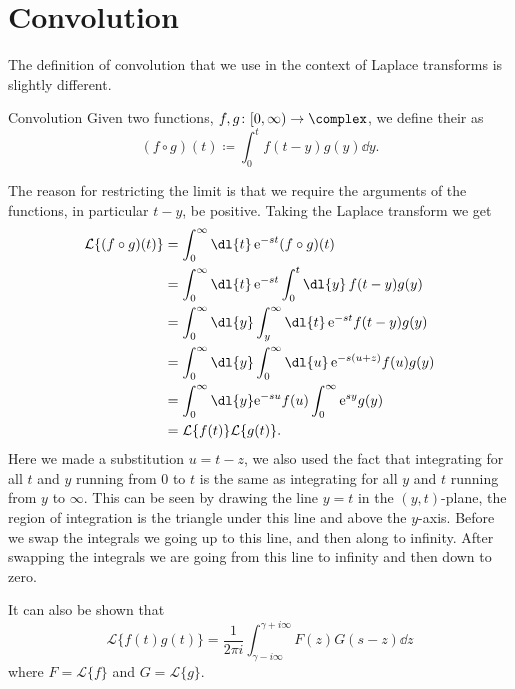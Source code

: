\documentclass[fleqn]{NotesClass}
\newcommand*{\e}{\mathrm{e}}
\newcommand*{\laplaceTransform}{\mathcal{L}}
\begin{document}
    \section{Convolution}
    The definition of convolution that we use in the context of Laplace transforms is slightly different.
    \begin{dfn}{Convolution}{}
        Given two functions, \(f, g \colon [0, \infty) \to \complex\), we define their  as
        \begin{equation}
            (f \circ g)(t) \coloneqq \int_{0}^{t} f(t - y)g(y) \dd{y}.
        \end{equation}
    \end{dfn}
    
    The reason for restricting the limit is that we require the arguments of the functions, in particular \(t - y\), be positive.
    Taking the Laplace transform we get
    \begin{align}
        \laplaceTransform\{ (f \circ g)(t) \} &= \int_{0}^{\infty} \dl{t} \, \e^{-st}(f \circ g)(t)\\
        &= \int_{0}^{\infty} \dl{t} \, \e^{-st} \int_{0}^{t} \dl{y} \, f(t - y)g(y)\\
        &= \int_{0}^{\infty} \dl{y} \int_{y}^{\infty} \dl{t} \, \e^{-st} f(t - y)g(y)\\
        &= \int_{0}^{\infty} \dl{y} \int_{0}^{\infty} \dl{u} \, \e^{-s(u + z)} f(u)g(y)\\
        &= \int_{0}^{\infty} \dl{y} \e^{-su} f(u) \int_{0}^{\infty} \e^{sy}g(y)\\
        &= \laplaceTransform\{ f(t) \} \laplaceTransform\{ g(t) \}.
    \end{align}
    Here we made a substitution \(u = t - z\), we also used the fact that integrating for all \(t\) and \(y\) running from \(0\) to \(t\) is the same as integrating for all \(y\) and \(t\) running from \(y\) to \(\infty\).
    This can be seen by drawing the line \(y = t\) in the \((y,t)\)-plane, the region of integration is the triangle under this line and above the \(y\)-axis.
    Before we swap the integrals we going up to this line, and then along to infinity.
    After swapping the integrals we are going from this line to infinity and then down to zero.
    
    It can also be shown that
    \begin{equation}
        \laplaceTransform\{f(t)g(t)\} = \frac{1}{2\pi i} \int_{\gamma - i\infty}^{\gamma + i\infty} F(z)G(s - z) \dd{z}
    \end{equation}
    where \(F = \laplaceTransform\{f\}\) and \(G = \laplaceTransform\{g\}\).
    
\end{document}
